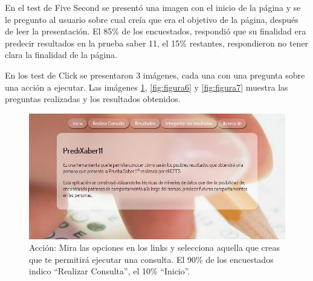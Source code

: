 En el test de Five Second se presentó una imagen con el inicio de la página y se le pregunto al usuario sobre cual creía que era el objetivo de la página, después de leer la presentación. El 85\% de los encuestados, respondió que su finalidad era predecir resultados en la prueba saber 11\degree, el 15\% restantes, respondieron no tener clara la finalidad de la página.

En los test de Click se presentaron 3 imágenes, cada una con una pregunta sobre una acción a ejecutar. Las imágenes \ref{fig:figura5}, \ref{fig:figura6} y \ref{fig:figura7} muestra las preguntas realizadas y los resultados obtenidos.
\begin{figure}[!htb]
\begin{centering}
\includegraphics[scale=0.65]{inicio}
\par\end{centering}
\caption{Acción: Mira las opciones en los links y selecciona aquella que creas que te permitirá ejecutar una consulta. El 90\% de los encuestados indico ``Realizar Consulta'', el 10\% ``Inicio''.}
\label{fig:figura5}
\end{figure}

